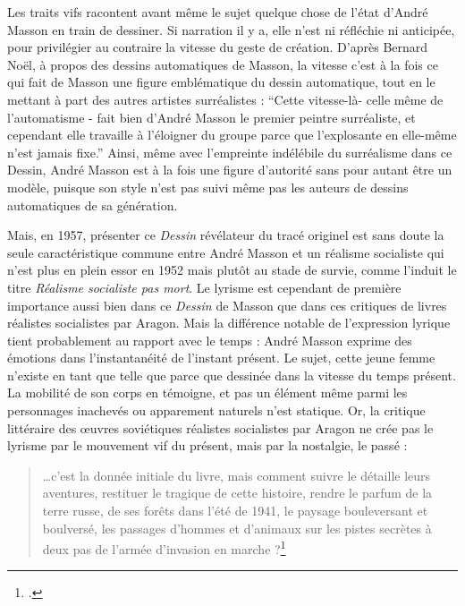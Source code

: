 	Les traits vifs racontent avant même le sujet quelque chose de l’état d’André Masson en train de dessiner. Si narration il y a, elle n’est ni réfléchie ni anticipée, pour privilégier au contraire la vitesse du geste de création. D’après Bernard Noël, à propos des dessins automatiques de Masson, la vitesse c’est à la fois ce qui fait de Masson une figure emblématique du dessin automatique, tout en le mettant à part des autres artistes surréalistes : \enquote{Cette vitesse-là- celle même de l’automatisme - fait bien d’André Masson le premier peintre surréaliste, et cependant elle travaille à l’éloigner du groupe parce que l’explosante en elle-même n’est jamais fixe.} Ainsi, même avec l’empreinte indélébile du surréalisme dans ce Dessin, André Masson est à la fois une figure d’autorité sans pour autant être un modèle, puisque son style n’est pas suivi même pas les auteurs de dessins automatiques de sa génération. 

	Mais, en 1957, présenter ce \emph{Dessin} révélateur du tracé originel est sans doute la seule caractéristique commune entre André Masson et un réalisme socialiste qui n’est plus en plein essor en 1952 mais plutôt au stade de survie, comme l’induit le titre \emph{Réalisme socialiste pas mort}. Le lyrisme est cependant de première importance aussi bien dans ce \emph{Dessin} de Masson que dans ces critiques de livres réalistes socialistes par Aragon. Mais la différence notable de l’expression lyrique tient probablement au rapport avec le temps : André Masson exprime des émotions dans l’instantanéité de l’instant présent. Le sujet, cette jeune femme n’existe en tant que telle que parce que dessinée dans la vitesse du temps présent. La mobilité de son corps en témoigne, et pas un élément même parmi les personnages inachevés ou apparement naturels n’est statique. Or, la critique littéraire des \oe{}uvres soviétiques réalistes socialistes par Aragon ne crée pas le lyrisme par le mouvement vif du présent, mais par la nostalgie, le passé : 

\begin{quote}
…c’est la donnée initiale du livre, mais comment suivre le détaille leurs aventures, restituer le tragique de cette histoire, rendre le parfum de la terre russe, de ses forêts dans l’été de 1941, le paysage bouleversant et boulversé, les passages d’hommes et d’animaux sur les pistes secrètes à deux pas de l’armée d’invasion en marche ?\footcite{realsoc}\end{quote}	


